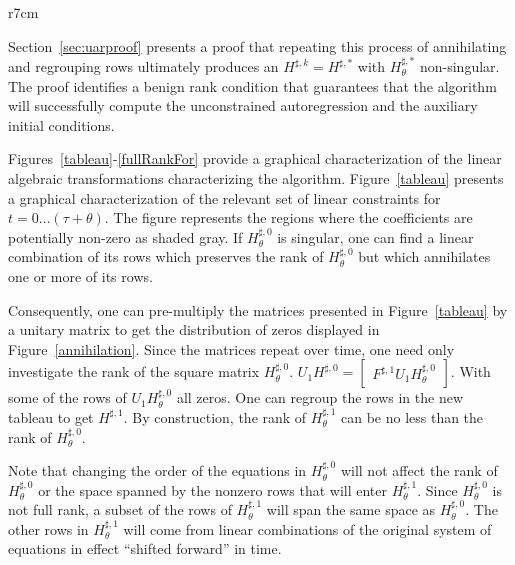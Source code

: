 \documentclass{elsart}
\begin{document}
\label{sec:gfrr}

\begin{wrapfigure}[29]{r}{7cm}



\end{wrapfigure}

Section~\ref{sec:uarproof} presents a proof that repeating 
this process of annihilating and regrouping rows ultimately  produces 
an $H^{\sharp,k}=H^{\sharp,\ast}$ with $H^{\sharp,\ast}_\theta$ non-singular.
The proof identifies a benign rank condition 
that guarantees that the algorithm will successfully compute
the unconstrained autoregression and the auxiliary initial conditions.

Figures~\ref{tableau}-\ref{fullRankFor} provide a graphical characterization
of the linear algebraic transformations characterizing the algorithm.
Figure~\ref{tableau}
presents a graphical characterization of the relevant
set of linear constraints for $t=0 \ldots (\tau{}+\theta{})$.
The figure represents the regions where the coefficients 
are potentially  non-zero as shaded gray. 
If $H^{\sharp,0}_\theta$ is singular, one can find a linear 
combination of its rows which  preserves the rank of $H^{\sharp,0}_\theta$ but
which annihilates one or more of its rows.  


Consequently, one can pre-multiply
the matrices presented in Figure~\ref{tableau} by a unitary matrix 
to get the distribution of
zeros displayed in Figure~\ref{annihilation}.      Since the matrices
repeat over time, one need
only investigate the rank of the square matrix $H^{\sharp,0}_\theta$.
$U_1 H^{\sharp,0}=\begin{bmatrix} F^{\sharp,1} U_1 H^{\sharp,0}_\theta\end{bmatrix}$.
With some of the rows of $U_1 H^{\sharp,0}_\theta$ all zeros.
One can  regroup the rows in the new tableau to get $H^{\sharp,1}$.
By construction, the rank of $H^{\sharp,1}_\theta$ can be no less than
the rank of $H^{\sharp,0}_\theta$.

Note that  changing the order of the equations in
$H^{\sharp,0}_\theta$ will not affect the rank of $H^{\sharp,0}_\theta$
or the space spanned by the nonzero rows that will enter
$H^{\sharp,1}_\theta$.  Since  $H^{\sharp,0}_\theta$ is not full rank, 
a subset of the rows of $H^{\sharp,1}_\theta$ will
span the same space as $H^{\sharp,0}_\theta$.  The other rows in
 $H^{\sharp,1}_\theta$  will come
from linear combinations of the original system of equations in effect
``shifted forward'' in time.  
\end{document}
